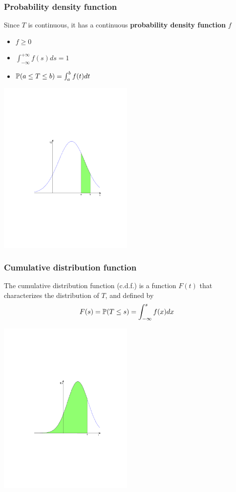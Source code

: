 \documentclass[aspectratio=169]{beamer}\usepackage[]{graphicx}\usepackage[]{xcolor}
\begin{document}
\begin{frame}\frametitle{Probability density function}
Since $T$ is continuous, it has a continuous \textbf{probability density
function} $f$
\begin{itemize}
\item $f\geq 0$
\item $\int_{-\infty}^{+\infty}f(s)ds=1$
\item $\mathbb{P}(a\leq T\leq b)=\int_a^bf(t)dt$
\end{itemize}
\begin{center}
\includegraphics[width=0.5\textwidth]{FIGS/distrib_a_b}
\end{center}
\end{frame}

\begin{frame}\frametitle{Cumulative distribution function}
The cumulative distribution function (c.d.f.) is a function $F(t)$ that characterizes the distribution of $T$, and defined by
\[
F(s)=\mathbb{P}(T\leq s)=\int_{-\infty}^sf(x)dx
\]
\begin{center}
\includegraphics[width=0.5\textwidth]{FIGS/cdf_auc}
\end{center}
\end{frame}
\end{document}
